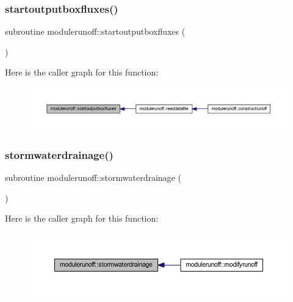 \subsubsection{\texorpdfstring{startoutputboxfluxes()}{startoutputboxfluxes()}}
{\footnotesize\ttfamily subroutine modulerunoff\+::startoutputboxfluxes (\begin{DoxyParamCaption}{ }\end{DoxyParamCaption})\hspace{0.3cm}{\ttfamily [private]}}

Here is the caller graph for this function\+:
\nopagebreak
\begin{figure}[H]
\begin{center}
\leavevmode
\includegraphics[width=350pt]{namespacemodulerunoff_a94b297f6c1f0a65686f92178ebe5d5c2_icgraph}
\end{center}
\end{figure}
\mbox{\label{namespacemodulerunoff_af4d68602fac4df4d58a06a8d87433a3b}} 
\subsubsection{\texorpdfstring{stormwaterdrainage()}{stormwaterdrainage()}}
{\footnotesize\ttfamily subroutine modulerunoff\+::stormwaterdrainage (\begin{DoxyParamCaption}{ }\end{DoxyParamCaption})\hspace{0.3cm}{\ttfamily [private]}}

Here is the caller graph for this function\+:
\nopagebreak
\begin{figure}[H]
\begin{center}
\leavevmode
\includegraphics[width=350pt]{namespacemodulerunoff_af4d68602fac4df4d58a06a8d87433a3b_icgraph}
\end{center}
\end{figure}
\mbox{\label{namespacemodulerunoff_acd023a67da604bbfb903587e80244138}} 

